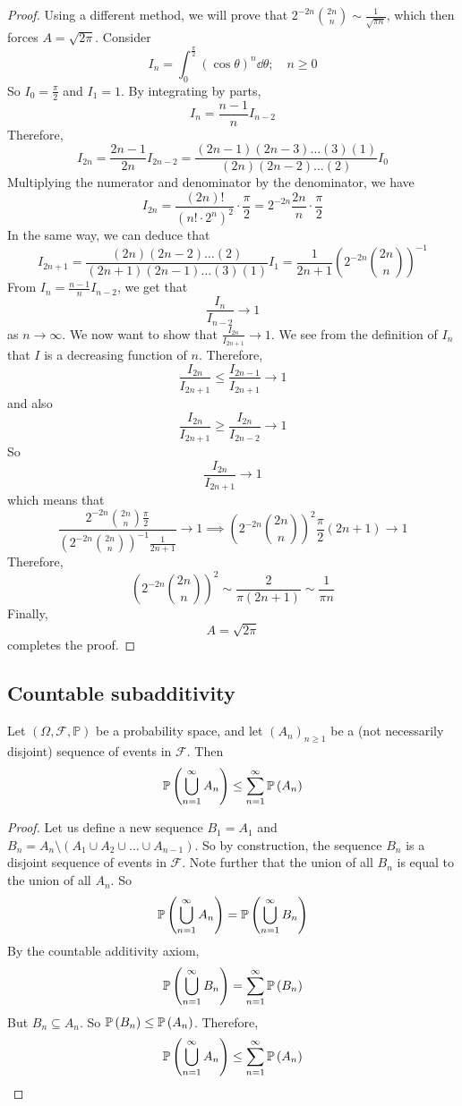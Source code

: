 \begin{proof}
	Using a different method, we will prove that \(2^{-2n} \binom{2n}{n} \sim \frac{1}{\sqrt{\pi n}}\), which then forces \(A = \sqrt{2\pi}\).
	Consider
	\[
		I_n = \int_0^{\frac{\pi}{2}} (\cos \theta)^n \dd{\theta};\quad n \geq 0
	\]
	So \(I_0 = \frac{\pi}{2}\) and \(I_1 = 1\).
	By integrating by parts,
	\[
		I_n = \frac{n-1}{n}I_{n-2}
	\]
	Therefore,
	\[
		I_{2n} = \frac{2n-1}{2n}I_{2n-2} = \frac{(2n-1)(2n-3)\dots(3)(1)}{(2n)(2n-2)\dots(2)}I_0
	\]
	Multiplying the numerator and denominator by the denominator, we have
	\[
		I_{2n} = \frac{(2n)!}{(n!
			\cdot 2^n)^2} \cdot \frac{\pi}{2} = 2^{-2n} \frac{2n}{n} \cdot \frac{\pi}{2}
	\]
	In the same way, we can deduce that
	\[
		I_{2n+1} = \frac{(2n)(2n-2)\dots(2)}{(2n+1)(2n-1)\dots(3)(1)}I_1 = \frac{1}{2n+1} \left( 2^{-2n} \binom{2n}{n} \right)^{-1}
	\]
	From \(I_n = \frac{n-1}{n}I_{n-2}\), we get that
	\[
		\frac{I_n}{I_{n-2}} \to 1
	\]
	as \(n \to \infty\).
	We now want to show that \(\frac{I_{2n}}{I_{2n+1}} \to 1\).
	We see from the definition of \(I_n\) that \(I\) is a decreasing function of \(n\).
	Therefore,
	\[
		\frac{I_{2n}}{I_{2n+1}} \leq \frac{I_{2n-1}}{I_{2n+1}} \to 1
	\]
	and also
	\[
		\frac{I_{2n}}{I_{2n+1}} \geq \frac{I_{2n}}{I_{2n-2}} \to 1
	\]
	So
	\[
		\frac{I_{2n}}{I_{2n+1}} \to 1
	\]
	which means that
	\[
		\frac{2^{-2n} \binom{2n}{n} \frac{\pi}{2}}{\left( 2^{-2n} \binom{2n}{n} \right)^{-1} \frac{1}{2n+1}} \to 1 \implies \left( 2^{-2n} \binom{2n}{n} \right)^2 \frac{\pi}{2} (2n+1) \to 1
	\]
	Therefore,
	\[
		\left( 2^{-2n} \binom{2n}{n} \right)^2 \sim \frac{2}{\pi (2n+1)} \sim \frac{1}{\pi n}
	\]
	Finally,
	\[
		A = \sqrt{2 \pi}
	\]
	completes the proof.
\end{proof}

\subsection{Countable subadditivity}
Let \((\Omega, \mathcal F, \mathbb P)\) be a probability space, and let \((A_n)_{n \geq 1}\) be a (not necessarily disjoint) sequence of events in \(\mathcal F\).
Then
\[
	\mathbb{P}\left({\bigcup_{n=1}^\infty A_n}\right) \leq \sum_{n=1}^\infty \mathbb{P}\left({A_n}\right)
\]
\begin{proof}
	Let us define a new sequence \(B_1 = A_1\) and \(B_n = A_n \setminus (A_1 \cup A_2 \cup \dots \cup A_{n-1})\).
	So by construction, the sequence \(B_n\) is a disjoint sequence of events in \(\mathcal F\).
	Note further that the union of all \(B_n\) is equal to the union of all \(A_n\).
	So
	\[
		\mathbb{P}\left({\bigcup_{n=1}^\infty A_n}\right) = \mathbb{P}\left({\bigcup_{n=1}^\infty B_n}\right)
	\]
	By the countable additivity axiom,
	\[
		\mathbb{P}\left({\bigcup_{n=1}^\infty B_n}\right) = \sum_{n=1}^\infty \mathbb{P}\left({B_n}\right)
	\]
	But \(B_n \subseteq A_n\).
	So \(\mathbb{P}\left({B_n}\right) \leq \mathbb{P}\left({A_n}\right)\).
	Therefore,
	\[
		\mathbb{P}\left({\bigcup_{n=1}^\infty A_n}\right) \leq \sum_{n=1}^\infty \mathbb{P}\left({A_n}\right)
	\]
\end{proof}

